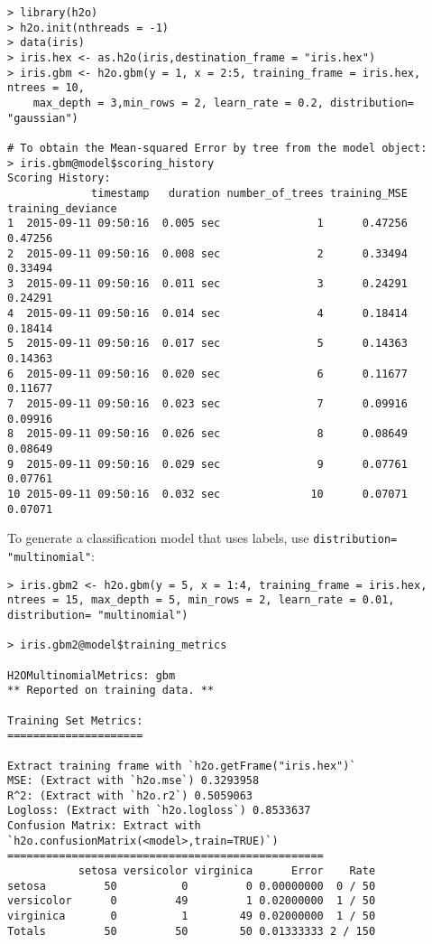 {{\waterExampleInR
\medskip
\begin{lstlisting}[style=R]
> library(h2o)
> h2o.init(nthreads = -1)
> data(iris)
> iris.hex <- as.h2o(iris,destination_frame = "iris.hex")
> iris.gbm <- h2o.gbm(y = 1, x = 2:5, training_frame = iris.hex, ntrees = 10,
    max_depth = 3,min_rows = 2, learn_rate = 0.2, distribution= "gaussian")

# To obtain the Mean-squared Error by tree from the model object:
> iris.gbm@model$scoring_history
Scoring History:
             timestamp   duration number_of_trees training_MSE training_deviance
1  2015-09-11 09:50:16  0.005 sec               1      0.47256           0.47256
2  2015-09-11 09:50:16  0.008 sec               2      0.33494           0.33494
3  2015-09-11 09:50:16  0.011 sec               3      0.24291           0.24291
4  2015-09-11 09:50:16  0.014 sec               4      0.18414           0.18414
5  2015-09-11 09:50:16  0.017 sec               5      0.14363           0.14363
6  2015-09-11 09:50:16  0.020 sec               6      0.11677           0.11677
7  2015-09-11 09:50:16  0.023 sec               7      0.09916           0.09916
8  2015-09-11 09:50:16  0.026 sec               8      0.08649           0.08649
9  2015-09-11 09:50:16  0.029 sec               9      0.07761           0.07761
10 2015-09-11 09:50:16  0.032 sec              10      0.07071           0.07071
\end{lstlisting}


To generate a classification model that uses labels, use {\texttt{distribution= "multinomial"}}:


\waterExampleInR
\medskip

\begin{lstlisting}[style=R]
> iris.gbm2 <- h2o.gbm(y = 5, x = 1:4, training_frame = iris.hex, ntrees = 15, max_depth = 5, min_rows = 2, learn_rate = 0.01, distribution= "multinomial")

> iris.gbm2@model$training_metrics

H2OMultinomialMetrics: gbm
** Reported on training data. **

Training Set Metrics:
=====================

Extract training frame with `h2o.getFrame("iris.hex")`
MSE: (Extract with `h2o.mse`) 0.3293958
R^2: (Extract with `h2o.r2`) 0.5059063
Logloss: (Extract with `h2o.logloss`) 0.8533637
Confusion Matrix: Extract with `h2o.confusionMatrix(<model>,train=TRUE)`)
=================================================
           setosa versicolor virginica      Error    Rate
setosa         50          0         0 0.00000000  0 / 50
versicolor      0         49         1 0.02000000  1 / 50
virginica       0          1        49 0.02000000  1 / 50
Totals         50         50        50 0.01333333 2 / 150


\end{lstlisting}}}
